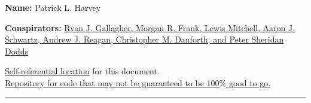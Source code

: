 \textbf{Name:} Patrick L. Harvey \\

\medskip

\textbf{Conspirators:} \href{https://doi.org/10.1140/epjds/s13688-021-00260-3}{Ryan J. Gallagher, Morgan R. Frank, Lewis Mitchell, Aaron J. Schwartz, Andrew J. Reagan, Christopher M. Danforth, and Peter Sheridan Dodds}

\href{https://www.overleaf.com/read/jwptqkrxjbkr}{Self-referential location} for this document.\\
\href{https://github.com/P-Harvey/csys303_assignments/tree/main/plharvey_19}{Repository for code that may not be guaranteed to be 100$\%$ good to go.}
\medskip
\medskip

\hrule

\medskip


